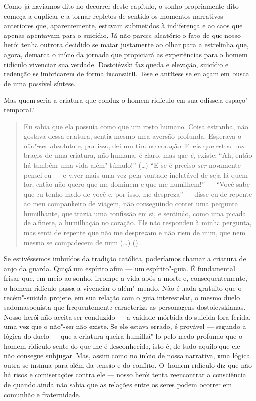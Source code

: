Como já havíamos dito no decorrer deste capítulo, o sonho propriamente
dito começa a duplicar e a tornar repletos de sentido os momentos
narrativos anteriores que, aparentemente, estavam submetidos à
indiferença e ao caos que apenas apontavam para o suicídio. Já não
parece aleatório o fato de que nosso herói tenha outrora decidido se
matar justamente ao olhar para a estrelinha que, agora, demarca o início
da jornada que propiciará as experiências para o homem ridículo
vivenciar sua verdade. Dostoiévski faz queda e elevação, suicídio e
redenção se imbricarem de forma inconsútil. Tese e antítese se enlaçam
em busca de uma possível síntese.

Mas quem seria a criatura que conduz o homem ridículo em sua odisseia
espaço"-temporal?

\begin{quote}
Eu sabia que ela possuía como que um rosto humano. Coisa estranha, não
gostava dessa criatura, sentia mesmo uma aversão profunda. Esperava o
não"-ser absoluto e, por isso, dei um tiro no coração. E~eis que estou
nos braços de uma criatura, não humana, é claro, mas que \emph{é},
existe: ``Ah, então há também uma vida além"-túmulo!'' (\ldots{}) ``E se
é preciso \emph{ser} novamente --- pensei eu --- e viver mais uma vez pela
vontade inelutável de seja lá quem for, então não quero que me dominem e
que me humilhem!'' --- ``Você sabe que eu tenho medo de você e, por isso,
me despreza'' --- disse eu de repente ao meu companheiro de viagem, não
conseguindo conter uma pergunta humilhante, que trazia uma confissão em
si, e sentindo, como uma picada de alfinete, a humilhação no coração.
Ele não respondeu à minha pergunta, mas senti de repente que não me
desprezam e não riem de mim, que nem mesmo se compadecem de mim
(\ldots{}) ().
\end{quote}

Se estivéssemos imbuídos da tradição católica, poderíamos chamar a
criatura de anjo da guarda. Quiçá um espírito afim --- um espírito"-guia.
É fundamental frisar que, em meio ao sonho, irrompe a vida após a morte
e, consequentemente, o homem ridículo passa a vivenciar o além"-mundo.
Não é nada gratuito que o recém"-suicida projete, em sua relação com o
guia interestelar, o mesmo duelo sadomasoquista que frequentemente
caracteriza as personagens dostoievskianas. Nosso herói não aceita ser
conduzido --- a vaidade mórbida do suicida fora ferida, uma vez que o
não"-ser não existe. Se ele estava errado, é provável --- segundo a lógica
do duelo --- que a criatura queira humilhá"-lo pelo medo profundo que o
homem ridículo sente do que lhe é desconhecido, isto é, de tudo aquilo
que ele não consegue subjugar. Mas, assim como no início de nossa
narrativa, uma lógica outra se insinua para além da tensão e do
conflito. O~homem ridículo diz que não há risos e comiserações contra
ele --- nosso herói tenta reencontrar a consciência de quando ainda não
sabia que as relações entre os seres podem ocorrer em comunhão e
fraternidade.

